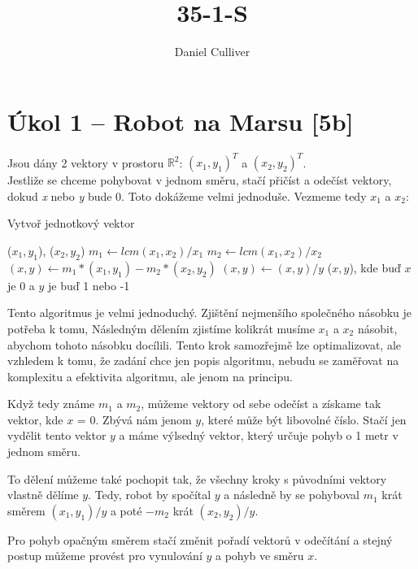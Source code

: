 \documentclass[12pt]{article}
\author{Daniel Culliver}
\title{35-1-S}
\begin{document}
\maketitle
\section*{Úkol 1 – Robot na Marsu [5b]}
Jsou dány 2 vektory v prostoru $\mathbb{R}^2$: $(x_1,y_1)^T$ a $(x_2,y_2)^T$.
\\
Jestliže se chceme pohybovat v jednom směru, stačí přičíst a odečíst vektory, dokud \emph{x} nebo \emph{y} bude 0.
Toto dokážeme velmi jednoduše. Vezmeme tedy $x_1$ a $x_2$:

\makeatletter
\renewcommand{\algorithmicrequire}{\textbf{Vstup:}}
\renewcommand{\algorithmicensure}{\textbf{Výstup:}}
\makeatother

\begin{algorithm}
    \caption{Vytvoř jednotkový vektor}
    \begin{algorithmic}[1]
        \REQUIRE ($x_1, y_1$), ($x_2, y_2$)
        \STATE $m_1 \gets lcm(x_1, x_2)/x_1$ 
        \STATE $m_2 \gets lcm(x_1, x_2)/x_2$ 
        \STATE $(x, y) \gets m_1*(x_1, y_1)-m_2*(x_2, y_2)$
        \STATE $(x, y) \gets (x, y)/y$
        \ENSURE ($x, y$), kde buď $x$ je 0 a $y$ je buď 1 nebo -1
    \end{algorithmic}
\end{algorithm}

Tento algoritmus je velmi jednoduchý. Zjištění nejmenšího společného násobku je potřeba k tomu,
Následným dělením zjistíme kolikrát musíme $x_1$ a $x_2$ násobit, abychom tohoto násobku docílili.
Tento krok samozřejmě lze optimalizovat, ale vzhledem k tomu, že zadání chce jen popis algoritmu,
nebudu se zaměřovat na komplexitu a efektivita algoritmu, ale jenom na principu.

Když tedy známe $m_1$ a $m_2$, můžeme vektory od sebe odečíst a získame tak vektor, kde $x$ = 0.
Zbývá nám jenom $y$, které může být libovolné číslo. Stačí jen vydělit tento vektor $y$ a máme výlsedný vektor,
který určuje pohyb o 1 metr v jednom směru.

To dělení můžeme také pochopit tak, že všechny kroky s původními vektory vlastně dělíme $y$.
Tedy, robot by spočítal $y$ a následně by se pohyboval $m_1$ krát směrem $(x_1, y_1)/y$ a poté $-m_2$ krát $(x_2, y_2)/y$.

Pro pohyb opačným směrem stačí změnit pořadí vektorů v odečítání a stejný postup můžeme provést pro vynulování $y$ a pohyb ve směru $x$.
\end{document}
